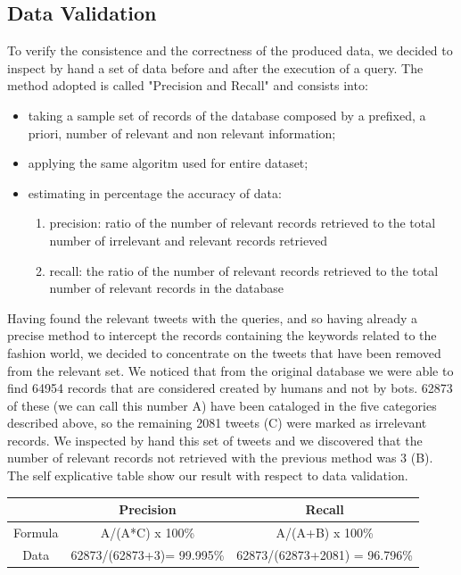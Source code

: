 \documentclass[conference, onecolumn]{IEEEtran}
\begin{document}
\subsection{Data Validation}
To verify the consistence and the correctness of the produced data, we decided to inspect by hand a set of data before and after the execution of a query. The method adopted is called "Precision and Recall" and consists into:
\begin{itemize}
	\item taking a sample set of records of the database composed by a prefixed, a priori, number of relevant and non relevant information;
	\item applying the same algoritm used for entire dataset;
	\item estimating in percentage the accuracy of data:
	\begin{enumerate}
	\item precision: ratio of the number of relevant records retrieved to the total number of irrelevant and relevant records retrieved
	\item recall: the ratio of the number of relevant records retrieved to the total number of relevant records in the database
\end{enumerate}
\end{itemize}
Having found the relevant tweets with the queries, and so having already a precise method to intercept the records containing the keywords related to the fashion world, we decided to concentrate on the tweets that have been removed from the relevant set. We noticed that from the original database we were able to find 64954 records that are considered created by humans and not by bots. 62873 of these (we can call this number A) have been cataloged in the five categories described above, so the remaining 2081 tweets (C) were marked as irrelevant records. We inspected by hand this set of tweets and we discovered that the number of relevant records not retrieved with the previous method was 3 (B).
The self explicative table show our result with respect to data validation.
\medskip

\begin{tabular}{|c|c|c|}
	\hline & Precision & Recall \\ 
	\hline Formula & A/(A*C) x 100\% & A/(A+B) x 100\% \\ 
	\hline Data & 62873/(62873+3)= 99.995\% & 62873/(62873+2081) = 96.796\% \\ 
	\hline 
\end{tabular}
\medskip
\end{document}

